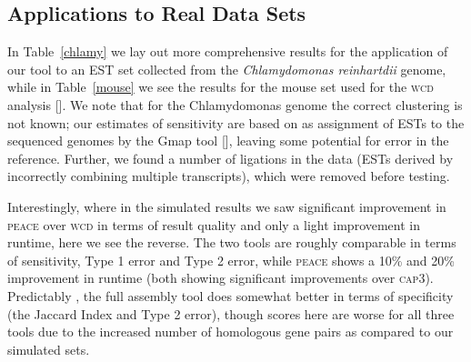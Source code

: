 \documentclass[a4paper,12pt]{article}
\begin{document}
\begin{appendix}
\section{Applications to Real Data Sets}

In Table~\ref{chlamy} we lay out more comprehensive results for the
application of our tool to an EST set collected from the {\it
  Chlamydomonas reinhartdii} genome, while in Table~\ref{mouse} 
we see the results for the mouse set used for the \textsc{wcd} analysis
[\cite{Hazelhurst08a}].  We note that for the Chlamydomonas genome the
correct clustering is not known; our estimates of sensitivity are
based on as assignment of ESTs to the sequenced genomes by the Gmap tool
[\cite{Wu05}], leaving some potential for error in the  reference.
Further, we found a number of ligations in the data (ESTs derived by
incorrectly combining multiple transcripts),  which were removed before testing.

Interestingly, where in the simulated results we saw significant
improvement in \textsc{peace} over \textsc{wcd} in terms of result quality and only a
light improvement in runtime, here we see the reverse. The two tools are
roughly comparable  in terms of sensitivity, Type 1 error and Type 2
error, while \textsc{peace} shows a 10\% and 20\% improvement in runtime (both
showing significant improvements over \textsc{cap3}).  Predictably , the full
assembly tool does somewhat better in terms of specificity (the Jaccard
Index and Type 2 error), though scores here are worse for all three
tools due to the increased number of homologous gene pairs as compared
to our simulated sets.


\end{appendix}
\end{document}
